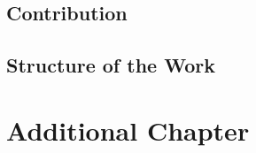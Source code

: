 \documentclass[draft,final]{vutinfth} %
\begin{document}
\section{Contribution}

\section{Structure of the Work}

\chapter{Additional Chapter}


\backmatter

\listoffigures %

\cleardoublepage %
\listoftables %

\listofalgorithms
{}

\printindex

\printglossaries



\end{document}
